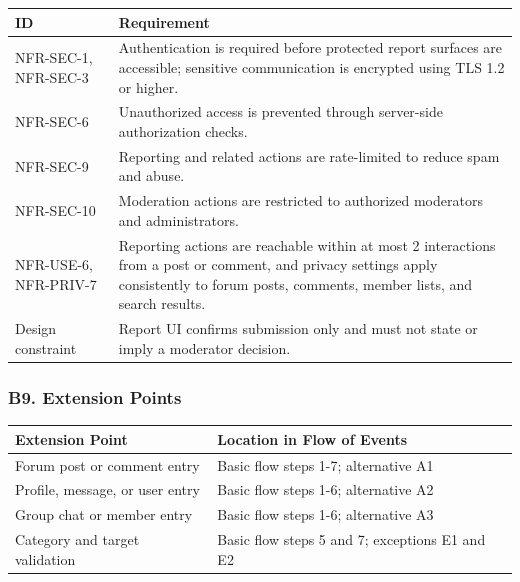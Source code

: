 \documentclass[12pt]{article}
\renewcommand{\baselinestretch}{1.5}
\begin{document}
\begingroup
\small
\renewcommand{\baselinestretch}{1.0}\selectfont
\renewcommand{\arraystretch}{1.15}
\setlength{\tabcolsep}{6pt}
\begin{longtable}{|>{\raggedright\arraybackslash}p{}|>{\raggedright\arraybackslash}p{}|}
\hline
\textbf{ID} & \textbf{Requirement} \\ \hline
\endhead
NFR-SEC-1, NFR-SEC-3 & Authentication is required before protected report surfaces are accessible; sensitive communication is encrypted using TLS 1.2 or higher. \\ \hline
NFR-SEC-6 & Unauthorized access is prevented through server-side authorization checks. \\ \hline
NFR-SEC-9 & Reporting and related actions are rate-limited to reduce spam and abuse. \\ \hline
NFR-SEC-10 & Moderation actions are restricted to authorized moderators and administrators. \\ \hline
NFR-USE-6, NFR-PRIV-7 & Reporting actions are reachable within at most 2 interactions from a post or comment, and privacy settings apply consistently to forum posts, comments, member lists, and search results. \\ \hline
Design constraint & Report UI confirms submission only and must not state or imply a moderator decision. \\ \hline
\end{longtable}
\endgroup
\par\medskip

\hypertarget{sec:b9-extension-points}{}
\subsubsection*{B9. Extension Points}
\par\medskip

\begingroup
\small
\renewcommand{\baselinestretch}{1.0}\selectfont
\renewcommand{\arraystretch}{1.15}
\setlength{\tabcolsep}{6pt}
\begin{longtable}{|>{\raggedright\arraybackslash}p{}|>{\raggedright\arraybackslash}p{}|}
\hline
\textbf{Extension Point} & \textbf{Location in Flow of Events} \\ \hline
\endhead
Forum post or comment entry & Basic flow steps 1-7; alternative A1 \\ \hline
Profile, message, or user entry & Basic flow steps 1-6; alternative A2 \\ \hline
Group chat or member entry & Basic flow steps 1-6; alternative A3 \\ \hline
Category and target validation & Basic flow steps 5 and 7; exceptions E1 and E2 \\ \hline
\end{longtable}
\endgroup
\par\medskip
\end{document}
